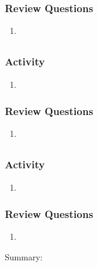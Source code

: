 \documentclass[12pt, draft]{article}
\begin{document}
\subsubsection{Review Questions}
\begin{enumerate}
\item 
\end{enumerate}

\subsection{}

\subsubsection{Activity}
\begin{enumerate}
\item 
\end{enumerate}

\subsubsection{Review Questions}
\begin{enumerate}
\item 
\end{enumerate}

\subsection{}

\subsubsection{Activity}
\begin{enumerate}
\item 
\end{enumerate}

\subsubsection{Review Questions}
\begin{enumerate}
\item 
\end{enumerate}

Summary: 
\end{document}
